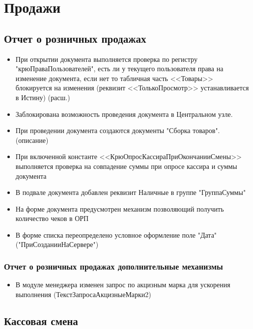 \section{Продажи}
\subsection{Отчет о розничных продажах}


\begin{itemize}
	\item При открытии документа выполняется проверка по регистру "крюПраваПользователей", есть ли у текущего пользователя права на изменение документа, если нет то табличная часть <<Товары>> блокируется на изменения (реквизит <<ТолькоПросмотр>> устанавливается в Истину) (расш.)
	\item Заблокирована возможность проведения документа в Центральном узле.
	\item При проведении документа создаются документы "Сборка товаров".(описание) 
	\item При включенной константе <<КрюОпросКассираПриОкончанииСмены>> выполняется проверка на совпадение суммы при опросе кассира и суммы документа
	\item В подвале документа добавлен реквизит Наличные в группе "ГруппаСуммы"
	\item На форме документа предусмотрен механизм позволяющий получить количество чеков в ОРП
	\item В форме списка переопределено условное оформление поле "Дата" ("ПриСозданииНаСервере")
	
	
\end{itemize}

\subsubsection{Отчет о розничных продажах дополнительные механизмы}
\begin{itemize}
	\item В модуле менеджера изменен запрос по акцизным марка для ускорения выполнения (ТекстЗапросаАкцизныеМарки2)
\end{itemize}



\subsection{Кассовая смена}


